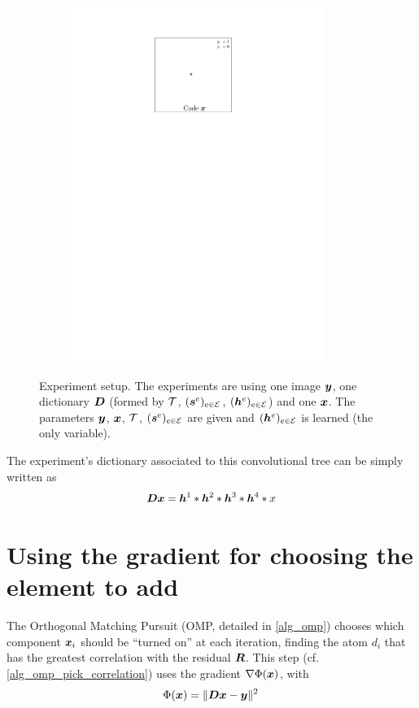 \begin{figure}[!ht]
\begin{subfigure}[b]{0.32\textwidth}
	\includegraphics[width=0.9\textwidth]{figures/xp_explain/code.pdf}
	\caption{}
\end{subfigure}
\caption{Experiment setup. The experiments are using one image $\bm{y}$, one dictionary $\bm{D}$ (formed by $\mathcal T$, $(\bm{s}^e)_{e \in \mathcal E}$, $(\bm{h}^e)_{e \in \mathcal E}$) and one $\bm{x}$. The parameters $\bm{y}$, $\bm{x}$, $\mathcal T$, $(\bm{s}^e)_{e \in \mathcal E}$ are given and $(\bm{h}^e)_{e \in \mathcal E}$ is learned (the only variable).}\label{fig_xp_explain}
\end{figure}
The experiment’s dictionary associated to this convolutional tree can be simply written as
$$\bm{D}\bm{x} = \bm{h}^1 * \bm{h}^2 * \bm{h}^3 * \bm{h}^4 * x$$

\section{Using the gradient for choosing the element to add}

The Orthogonal Matching Pursuit (\ac{OMP}, detailed in \cref{alg_omp}) chooses which component $\bm{x}_i$ should be “turned on” at each iteration, finding the atom $d_i$ that has the greatest correlation with the residual $\bm{R}$. This step (cf. \cref{alg_omp_pick_correlation}) uses the gradient $\nabla \Phi(\bm{x})$, with $$\Phi(\bm{x}) = \lVert \bm{D}\bm{x} - \bm{y} \rVert^2$$


